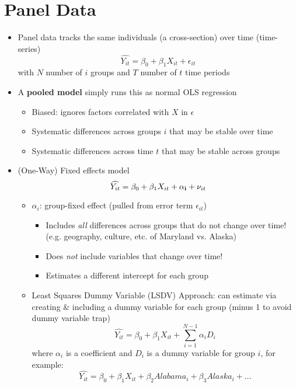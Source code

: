 \documentclass{article}
\begin{document}
\section*{Panel Data}
\begin{itemize}
	\item Panel data tracks the same individuals (a cross-section) over time (time-series)
		\begin{equation*}
	\widehat{Y_{it}}=\beta_0+\beta_1X_{it}+\epsilon_{it}
	\end{equation*}
	with $N$ number of $i$ groups and $T$ number of $t$ time periods	
	\item A \textbf{pooled model} simply runs this as normal OLS regression
	\begin{itemize}
		\item Biased: ignores factors correlated with $X$ in $\epsilon$
		\item Systematic differences across groups $i$ that may be stable over time
		\item Systematic differences across time $t$ that may be stable across groups
	\end{itemize}
	\item (One-Way) Fixed effects model 
	\begin{equation*}
	\widehat{Y_{it}}=\beta_0+\beta_1X_{it}+\mathbf{\alpha_i}+\nu_{it}\\
	\end{equation*}
	\begin{itemize}
		\item  $\alpha_i$: group-fixed effect (pulled from error term $\epsilon_{it}$)  
		\begin{itemize}
			\item Includes \emph{all} differences across groups that do not change over time! (e.g. geography, culture, etc. of Maryland vs. Alaska)
			\item Does \emph{not} include variables that change over time! 
			\item Estimates a different intercept for each group
		\end{itemize}
		\item Least Squares Dummy Variable (LSDV) Approach: can estimate via creating \& including a dummy variable for each group (minus 1 to avoid dummy variable trap)
		\begin{equation*}
			\widehat{Y_{it}}=\beta_0+\beta_1X_{it}+\sum_{i=1}^{N-1} \alpha_i D_{i}
		\end{equation*}
			where $\alpha_i$ is a coefficient and $D_i$ is a dummy variable for group $i$, for example: 
			\begin{equation*}
				\widehat{Y_{it}}=\beta_0+\beta_1X_{it}+\beta_2 Alabama_i+\beta_3 Alaska_i+...
			\end{equation*}


\end{itemize}
\end{itemize}
\end{document}
